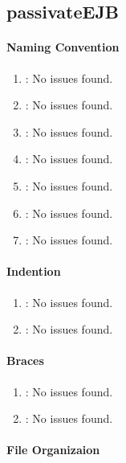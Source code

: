 \subsection{passivateEJB} %
\label{sub:passivateEJB}

\paragraph{Naming Convention} %
\label{par:naming_convention}

\begin{enumerate}
	\item \emph{\checkA}: No issues found.
	\item \emph{\checkB}: No issues found.
	\item \emph{\checkC}: No issues found.
	\item \emph{\checkD}: No issues found.
	\item \emph{\checkE}: No issues found.
	\item \emph{\checkF}: No issues found.
	\item \emph{\checkG}: No issues found.
\end{enumerate}

\paragraph{Indention} %
\label{par:indention}

\begin{enumerate} [resume]
	\item \emph{\checkH}: No issues found.
	\item \emph{\checkI}: No issues found.
\end{enumerate}

\paragraph{Braces} %
\label{par:braces}

\begin{enumerate} [resume]
	\item \emph{\checkJ}: No issues found.
	\item \emph{\checkK}: No issues found.
\end{enumerate}

\paragraph{File Organizaion} %
\label{par:file_organizaion}

